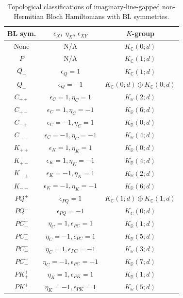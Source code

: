 \documentclass{tADP2e}
\theoremstyle{plain}
\theoremstyle{plain}
\theoremstyle{definition}
\begin{document}
\begin{appendices}
\begin{table}[tbp]
\caption{Topological classifications of imaginary-line-gapped non-Hermitian Bloch Hamiltonians with BL symmetries.}
\begin{center}
\small
\begin{tabular}{ccc}
\hline\hline
BL sym. & $\epsilon_X$, $\eta_X$, $\epsilon_{XY}$ & $K$-group \\ 
\hline
None & N/A  & $K_{\mathbb{C}}(0;d)$  \\ 
$P$ & N/A & $K_{\mathbb{C}}(1;d)$ \\ 
$Q_+$ & $\epsilon_Q=1$ & $K_{\mathbb{C}}(1;d)$ \\ 
$Q_-$ & $\epsilon_Q=-1$ & $K_{\mathbb{C}}(0;d)\oplus K_{\mathbb{C}}(0;d)$ \\ 
$C_{++}$ & $\epsilon_C=1,\eta_C=1$ & $K_{\mathbb{R}}(2;d)$ \\ 
$C_{+-}$ & $\epsilon_C=1,\eta_C=-1$ & $K_{\mathbb{R}}(6;d)$ \\ 
$C_{-+}$ & $\epsilon_C=-1,\eta_C=1$ & $K_{\mathbb{R}}(0;d)$ \\ 
$C_{--}$ & $\epsilon_C=-1,\eta_C=-1$ & $K_{\mathbb{R}}(4;d)$ \\
$K_{++}$ & $\epsilon_K=1,\eta_K=1$ & $K_{\mathbb{R}}(0;d)$ \\
$K_{+-}$ & $\epsilon_K=1,\eta_K=-1$ & $K_{\mathbb{R}}(4;d)$ \\
$K_{-+}$ & $\epsilon_K=-1,\eta_K=1$ & $K_{\mathbb{R}}(2;d)$ \\
$K_{--}$ & $\epsilon_K=-1,\eta_K=-1$ & $K_{\mathbb{R}}(6;d)$ \\
$PQ^+$ & %
$\epsilon_{PQ}=1$ & $K_{\mathbb{C}}(1;d)\oplus K_{\mathbb{C}}(1;d)$ \\
$PQ^-$ & %
$\epsilon_{PQ}=-1$ & $K_{\mathbb{C}}(0;d)$ \\
$PC^+_+$ & %
$\eta_C=1,\epsilon_{PC}=1$ & $K_{\mathbb{R}}(1;d)$ \\
$PC^+_-$ & %
$\eta_C=-1,\epsilon_{PC}=1$ & $K_{\mathbb{R}}(5;d)$ \\
$PC^-_+$ & %
$\eta_C=1,\epsilon_{PC}=-1$ & $K_{\mathbb{R}}(3;d)$ \\
$PC^-_-$ & %
$\eta_C=-1,\epsilon_{PC}=-1$ & $K_{\mathbb{R}}(7;d)$ \\
$PK^+_+$ & %
$\eta_K=1,\epsilon_{PK}=1$ & $K_{\mathbb{R}}(1;d)$ \\
$PK^+_-$ & %
$\eta_K=-1,\epsilon_{PK}=1$ & $K_{\mathbb{R}}(5;d)$ \\

\end{tabular}
\end{center}
\end{table}
\end{appendices}
\end{document}
